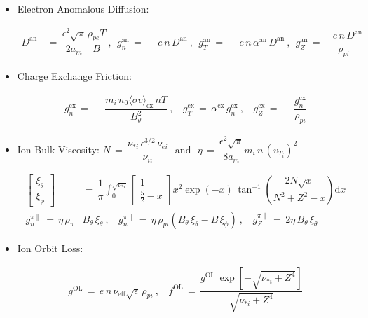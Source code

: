 \documentclass[a4paper,8pt]{article}
\providecommand{\tightlist}{%
  \setlength{\itemsep}{0pt}\setlength{\parskip}{0pt}}
\begin{document}
\begin{itemize}
\tightlist
\item
  Electron Anomalous Diffusion: \small

  \begin{align}
  D^\text{an} \,&=\, \dfrac{\epsilon^2 \sqrt{\pi}}{2 a_m} \dfrac{\rho_{pe} T}{B}~,~~ g_n^\text{an} \,=\, -e \,n\, D^\text{an}~,~~ g_T^\text{an} \,=\, -e \,n\, \alpha^\text{an}\, D^\text{an}~,~~ g_Z^\text{an} \,=\, \dfrac{-e \,n\, D^\text{an}}{\rho_{pi}}
  \end{align}

  \normalsize
\item
  Charge Exchange Friction: \small

  \begin{align}
  g_n^\text{cx} \,=\, -\dfrac{m_i \,n_0 \langle\sigma v\rangle_\text{cx} \,n T}{B_\theta^2}~,~~~~ g_T^\text{cx} \,=\, \alpha^\text{cx}\,g_n^\text{cx}~,~~~~ g_Z^\text{cx} \,=\, -\dfrac{g_n^\text{cx}}{\rho_{pi}}
  \end{align}

  \normalsize
\item
  Ion Bulk Viscosity:
  \(N \,=\, \dfrac{\nu_{*i}\,\epsilon^{3/2}\,\nu_{ei}}{\nu_{ii}} ~~~\text{and}~~~ \eta \,=\, \dfrac{\epsilon^2 \sqrt{\pi}}{8 a_m} m_i \,n\, (v_{T_i})^2\)
  \small

  \begin{align}
  \begin{bmatrix}\xi_\theta \\[1ex] \xi_\phi \end{bmatrix} \,&=\, \dfrac{1}{\pi} \int_0^{\sqrt{\nu_{*i}}} \begin{bmatrix} 1 \\[1ex] \frac{5}{2} - x \end{bmatrix} x^2 \exp(-x) \, \tan^{-1}\left(\dfrac{2 N \sqrt{x}}{N^2 + Z^2 - x}\right) \text{d}x \\
  g_n^{\pi\parallel} \,=\, \eta \, \rho_{\pi}& B_\theta \, \xi_\theta~,~~~~ g_n^{\pi\parallel} \,=\, \eta \, \rho_{pi} \left(B_\theta\,\xi_\theta - B\,\xi_\phi\right)~,~~~~ g_Z^{\pi\parallel} \,=\, 2\eta \, B_\theta \, \xi_\theta
  \end{align}

  \normalsize
\end{itemize}

\begin{itemize}
\tightlist
\item
  Ion Orbit Loss: \small

  \begin{align}
  g^\text{OL} \,=\, e \,n\, \nu_\text{eff} \sqrt{\epsilon} \,\rho_{pi}~,~~~~ f^\text{OL} \,=\, \dfrac{g^\text{OL}\,\exp\left[-\sqrt{\nu_{*i} + Z^4}\right]}{\sqrt{\nu_{*i} + Z^4}}
  \end{align}

  \normalsize
\end{itemize}
\end{document}

